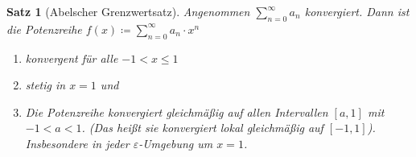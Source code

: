 \documentclass[11pt, twoside, a4paper]{article}
\theoremstyle{plain}
\newtheorem{satz}[blockelement]{Satz}
\numberwithin{equation}{subsection}
\newcommand{\interv}[1]{\left[#1\right]}
\begin{document}
    \begin{satz}[Abelscher Grenzwertsatz] %
        \label{satz:abel-grenzwert}
        Angenommen $\displaystyle \sum_{n=0}^{\infty} a_n$ konvergiert. Dann ist die Potenzreihe $\displaystyle f(x) \coloneqq\sum_{n=0}^{\infty} a_n\cdot x^n$
        \begin{enumerate}[label=(\roman*)]
            \item konvergent für alle $-1 < x \leq 1$
            \item stetig in $x=1$ und
            \item Die Potenzreihe konvergiert gleichmäßig auf allen Intervallen $\interv{a, 1}$ mit $-1 < a < 1$. (Das heißt sie konvergiert lokal gleichmäßig auf $\interv{-1, 1}$). Insbesondere in jeder $\varepsilon$-Umgebung um $x=1$.
        \end{enumerate}


\end{satz}
\end{document}
